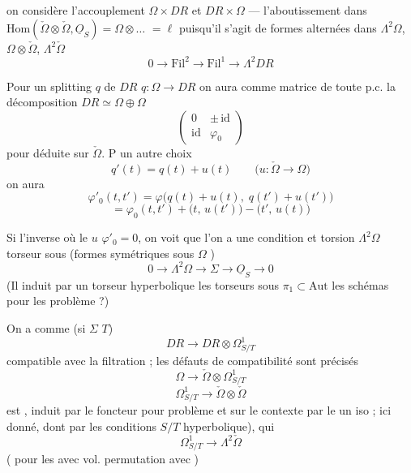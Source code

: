 \documentclass[11pt,a4paper]{article}
\begin{document}
\ill{} on considère \ill{} l'accouplement \ill{} $\Omega \times DR$ et
$DR \times \Omega$ --- l'aboutissement \ill{} dans \struck{\ill{}}
$\mathrm{Hom}(\check{\Omega} \otimes \check{\Omega}, \underline{O}_S)
= \Omega \otimes \ldots$ \ill{} $= \ell$ puisqu'il s'agit de formes alternées
\ill{} dans $\Lambda^2 \Omega$, $\Omega \otimes \check{\Omega}$,
$\Lambda^2 \check{\Omega}$
\[
  0 \longrightarrow \mathrm{Fil}^2 \longrightarrow \mathrm{Fil}^1
  \longrightarrow \Lambda^2 DR
\]

Pour un splitting $q$ de $DR$ \struck{\ill{}} $q : \Omega \to DR$ \ill{} on
aura comme matrice de toute p.c. la décomposition
$DR \simeq \Omega \oplus \Omega$
\[
  \begin{pmatrix} 0 & \pm\,\mathrm{id} \\ \mathrm{id} & \varphi_0 \end{pmatrix}
\]
\ill{} pour \ill{} déduite sur $\check{\Omega}$. P\ill{} un autre choix
\[
  q'(t) = q(t) + u(t) \qquad \big( u : \check{\Omega} \to \Omega \big)
\]
\ill{} on aura
\[
  \varphi'_0(t,t') = \varphi\big( q(t) + u(t),\; q(t') + u(t') \big)
\]
\[
  = \varphi_0(t,t') + \big( t,\, u(t') \big) - \big( t',\, u(t) \big)
\]


Si \ill{} l'inverse \ill{} où le $u$ \ill{} $\varphi'_0 = 0$, on voit que
l'on a une condition \ill{} et \ill{} torsion \ill{} $\Lambda^2 \Omega$
\ill{} torseur sous \ill{} (formes symétriques sous $\Omega$ \ill{})
\[
  0 \longrightarrow \Lambda^2 \Omega \longrightarrow \Sigma \longrightarrow
  \underline{O}_S \longrightarrow 0
\]
(Il \ill{} induit par un torseur \ill{} hyperbolique \ill{} les torseurs sous
$\pi_1 \subset \mathrm{Aut}$ \ill{} les schémas \ill{} pour les \ill{}
problème ?)

On a comme \ill{} (si $\Sigma$ \ill{} $T$)
\[
  DR \longrightarrow DR \otimes \Omega^1_{S/T}
\]
\ill{} compatible avec la filtration \ill{} ; les défauts de compatibilité
sont précisés \ill{}
\[
  \Omega \longrightarrow \check{\Omega} \otimes \Omega^1_{S/T}
\]
\ill{}
\[
  \Omega^1_{S/T} \longrightarrow \check{\Omega} \otimes \check{\Omega}
\]
\ill{} est \struck{\ill{}}, induit par le foncteur \ill{} pour problème
\ill{} et sur le contexte \ill{} par le \struck{\ill{}} un iso ; ici donné,
dont \ill{} par les conditions \ill{} $S/T$ \ill{} hyperbolique), \ill{} qui
\ill{}
\[
  \Omega^1_{S/T} \longrightarrow \Lambda^2 \check{\Omega}
\]
(\ill{} pour les \ill{} avec vol. \ill{} permutation avec \ill{})
\end{document}
